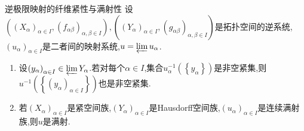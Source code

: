\begin{corollary}{逆极限映射的纤维紧性与满射性}{}
	设$\left(\left(X_{\alpha}\right)_{\alpha\in I},\left(f_{\alpha\beta}\right)_{\alpha,\beta\in I}\right),\left(\left(Y_{\alpha}\right)_{\alpha\in I},\left(g_{\alpha\beta}\right)_{\alpha,\beta\in I}\right)$是拓扑空间的逆系统,$\left(u_{\alpha}\right)_{\alpha\in I}$是二者间的映射系统,$u=\varprojlim u_{\alpha}$.
	\begin{enumerate}
		\item 设$\left(y_{\alpha}\right)_{\alpha\in I}\in\varprojlim Y_{\alpha}$.若对每个$\alpha\in I$,集合$u_{\alpha}^{-1}\left(\left\{y_{\alpha}\right\}\right)$是非空紧集,则$u^{-1}\left(\left\{\left(y_{\alpha}\right)_{\alpha\in I}\right\}\right)$也是非空紧集.
		\item 若$\left(X_{\alpha}\right)_{\alpha\in I}$是紧空间族,$\left(Y_{\alpha}\right)_{\alpha\in I}$是Hausdorff空间族,$\left(u_{\alpha}\right)_{\alpha\in I}$是连续满射族,则$u$是满射.
	\end{enumerate}
\end{corollary}













